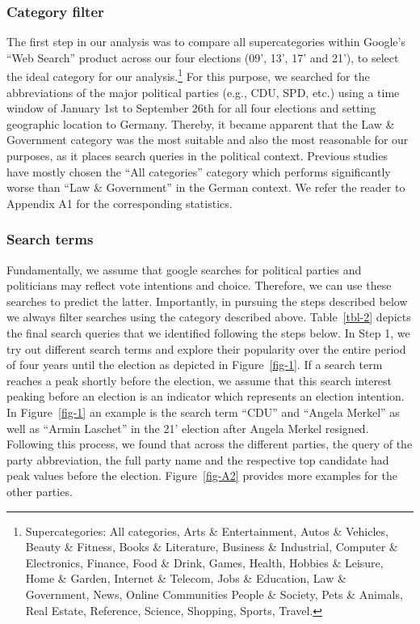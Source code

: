 \documentclass[
  letterpaper,
  DIV=11,
  numbers=noendperiod]{scrartcl}
\begin{document}
\hypertarget{category-filter}{%
\subsubsection{Category filter}\label{category-filter}}

The first step in our analysis was to compare all supercategories within
Google's ``Web Search'' product across our four elections (09', 13', 17'
and 21'), to select the ideal category for our analysis.\footnote{Supercategories:
  All categories, Arts \& Entertainment, Autos \& Vehicles, Beauty \&
  Fitness, Books \& Literature, Business \& Industrial, Computer \&
  Electronics, Finance, Food \& Drink, Games, Health, Hobbies \&
  Leisure, Home \& Garden, Internet \& Telecom, Jobs \& Education, Law
  \& Government, News, Online Communities People \& Society, Pets \&
  Animals, Real Estate, Reference, Science, Shopping, Sports, Travel.}
For this purpose, we searched for the abbreviations of the major
political parties (e.g., CDU, SPD, etc.) using a time window of January
1st to September 26th for all four elections and setting geographic
location to Germany. Thereby, it became apparent that the Law \&
Government category was the most suitable and also the most reasonable
for our purposes, as it places search queries in the political context.
Previous studies have mostly chosen the ``All categories'' category
which performs significantly worse than ``Law \& Government'' in the
German context. We refer the reader to Appendix A1 for the corresponding
statistics.

\hypertarget{search-terms}{%
\subsubsection{Search terms}\label{search-terms}}

Fundamentally, we assume that google searches for political parties and
politicians may reflect vote intentions and choice. Therefore, we can
use these searches to predict the latter. Importantly, in pursuing the
steps described below we always filter searches using the category
described above. Table~\ref{tbl-2} depicts the final search queries that
we identified following the steps below. In Step 1, we try out different
search terms and explore their popularity over the entire period of four
years until the election as depicted in Figure~\ref{fig-1}. If a search
term reaches a peak shortly before the election, we assume that this
search interest peaking before an election is an indicator which
represents an election intention. In Figure~\ref{fig-1} an example is
the search term ``CDU'' and ``Angela Merkel'' as well as ``Armin
Laschet'' in the 21' election after Angela Merkel resigned. Following
this process, we found that across the different parties, the query of
the party abbreviation, the full party name and the respective top
candidate had peak values before the election. Figure~\ref{fig-A2}
provides more examples for the other parties.
\end{document}
